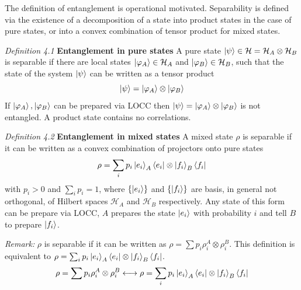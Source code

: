 \documentclass[10pt,a4paper]{book}
\numberwithin{equation}{chapter}
\numberwithin{figure}{chapter}
\numberwithin{table}{chapter}
\begin{document}
The definition of entanglement is operational motivated. Separability is defined via the existence of a decomposition of a state into product states in the case of pure states, or into a convex combination of tensor product for mixed states.

\textit{Definition 4.1} \textbf{Entanglement in pure states} A pure state $\ket{\psi} \in \mathcal{H}=\mathcal{H}_A \otimes \mathcal{H}_B$ is separable if there are local states $\ket{\varphi_A}\in \mathcal{H}_A$ and $\ket{\varphi_B}\in \mathcal{H}_B$, such that the state of the system $\ket{\psi}$ can be written as a tensor product
\begin{equation}
\ket{\psi}=\ket{\varphi_A}\otimes \ket{\varphi_B}
\end{equation}
If $\ket{\varphi_A},\ket{\varphi_B}$ can be prepared via LOCC then $\ket{\psi}=\ket{\varphi_A}\otimes \ket{\varphi_B}$ is not entangled. A product state contains no correlations. 

\textit{Definition 4.2} \textbf{Entanglement in mixed states} A mixed state $\rho$ is separable if it can be written as a convex combination of projectors onto pure states
\begin{equation}
\rho = \sum_i p_i \ket{e_i}_A \bra{e_i} \otimes \ket{f_i}_B \bra{f_i}
\label{eq:mixed}
\end{equation}
with $p_i > 0$ and $\sum_i p_i =1$, where $\lbrace \ket{e_i} \rbrace$ and $\lbrace \ket{f_i} \rbrace$ are basis, in general not orthogonal, of Hilbert spaces $\mathcal{H}_A$ and $\mathcal{H}_B$ respectively. Any state of this form can be prepare via LOCC, $A$ prepares the state $\ket{e_i}$ with probability $i$ and tell $B$ to prepare $\ket{f_i}$.

\textsl{\textit{Remark:}} $\rho$ is separable if it can be written as $\rho= \sum p_i \rho^{A}_i \otimes \rho^{B}_i$. This definition is equivalent to $\rho = \sum_i p_i \ket{e_i}_A \bra{e_i} \otimes \ket{f_i}_B \bra{f_i}$.
\begin{equation}
\rho= \sum p_i \rho^{A}_i \otimes \rho^{B}_i \longleftrightarrow \rho = \sum_i p_i \ket{e_i}_A \bra{e_i} \otimes \ket{f_i}_B \bra{f_i}
\end{equation}
\end{document}
